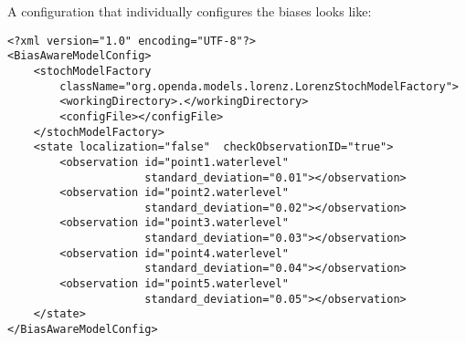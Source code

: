 A configuration that individually configures the biases looks like:
\begin{verbatim}
<?xml version="1.0" encoding="UTF-8"?>
<BiasAwareModelConfig>
	<stochModelFactory
		className="org.openda.models.lorenz.LorenzStochModelFactory">
		<workingDirectory>.</workingDirectory>
		<configFile></configFile>
	</stochModelFactory>
	<state localization="false"  checkObservationID="true">
		<observation id="point1.waterlevel"
		             standard_deviation="0.01"></observation>
		<observation id="point2.waterlevel" 
		             standard_deviation="0.02"></observation>
		<observation id="point3.waterlevel"
		             standard_deviation="0.03"></observation>
		<observation id="point4.waterlevel" 
		             standard_deviation="0.04"></observation>
		<observation id="point5.waterlevel" 
		             standard_deviation="0.05"></observation>
	</state>
</BiasAwareModelConfig>
\end{verbatim}

